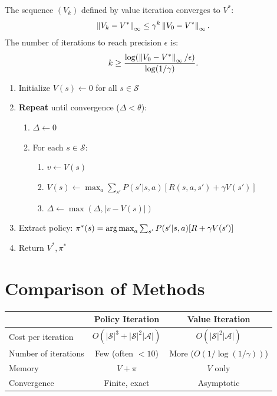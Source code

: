 \begin{theorem}
The sequence $(V_k)$ defined by value iteration converges to $V^*$:
\[
    \left\| V_k - V^* \right\|_\infty \leq \gamma^k \left\| V_0 - V^* \right\|_\infty.
\]
The number of iterations to reach precision $\epsilon$ is:
\[
    k \geq \frac{\log(\left\| V_0 - V^* \right\|_\infty / \epsilon)}{\log(1/\gamma)}.
\]
\end{theorem}

\begin{algorithme}[title=\textbf{Value Iteration}]
\begin{enumerate}
    \item Initialize $V(s) \leftarrow 0$ for all $s \in \mathcal{S}$
    \item \textbf{Repeat} until convergence ($\Delta < \theta$):
    \begin{enumerate}
        \item $\Delta \leftarrow 0$
        \item For each $s \in \mathcal{S}$:
        \begin{enumerate}
            \item $v \leftarrow V(s)$
            \item $V(s) \leftarrow \max_a \sum_{s'} P(s'|s,a)[R(s,a,s') + \gamma V(s')]$
            \item $\Delta \leftarrow \max(\Delta, |v - V(s)|)$
        \end{enumerate}
    \end{enumerate}
    \item Extract policy: $\pi^*(s) = \operatorname*{arg\,max}_a \sum_{s'} P(s'|s,a)[R + \gamma V(s')]$
    \item Return $V^*, \pi^*$
\end{enumerate}
\end{algorithme}

\section{Comparison of Methods}

\begin{center}
\renewcommand{\arraystretch}{1.3}
\begin{tabular}{lcc}
    \toprule
    & \textbf{Policy Iteration} & \textbf{Value Iteration} \\
    \midrule
    Cost per iteration & $O(|\mathcal{S}|^3 + |\mathcal{S}|^2 |\mathcal{A}|)$ &
    $O(|\mathcal{S}|^2 |\mathcal{A}|)$ \\
    Number of iterations & Few (often $< 10$) & More ($O(1/\log(1/\gamma))$) \\
    Memory & $V + \pi$ & $V$ only \\
    Convergence & Finite, exact & Asymptotic \\
    \bottomrule
\end{tabular}
\end{center}

